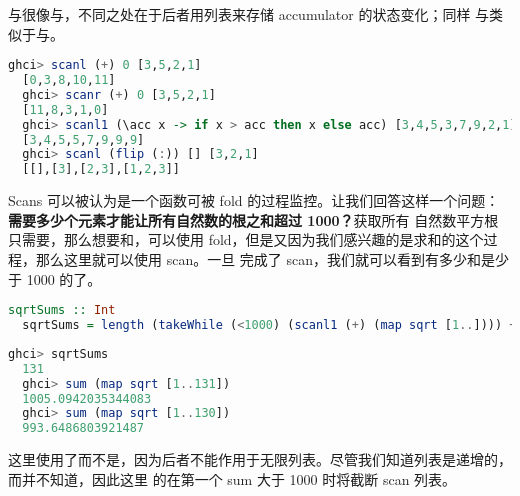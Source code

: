 \documentclass[./main.tex]{subfiles}
\begin{document}
与很像与，不同之处在于后者用列表来存储 accumulator 的状态变化；同样
与类似于与。

\begin{lstlisting}[language=Haskell]
  ghci> scanl (+) 0 [3,5,2,1]
  [0,3,8,10,11]
  ghci> scanr (+) 0 [3,5,2,1]
  [11,8,3,1,0]
  ghci> scanl1 (\acc x -> if x > acc then x else acc) [3,4,5,3,7,9,2,1]
  [3,4,5,5,7,9,9,9]
  ghci> scanl (flip (:)) [] [3,2,1]
  [[],[3],[2,3],[1,2,3]]
\end{lstlisting}

Scans 可以被认为是一个函数可被 fold 的过程监控。让我们回答这样一个问题：\textbf{需要多少个元素才能让所有自然数的根之和超过 1000？}获取所有
自然数平方根只需要，那么想要和，可以使用 fold，但是又因为我们感兴趣的是求和的这个过程，那么这里就可以使用 scan。一旦
完成了 scan，我们就可以看到有多少和是少于 1000 的了。

\begin{lstlisting}[language=Haskell]
  sqrtSums :: Int
  sqrtSums = length (takeWhile (<1000) (scanl1 (+) (map sqrt [1..]))) + 1
\end{lstlisting}

\begin{lstlisting}[language=Haskell]
  ghci> sqrtSums
  131
  ghci> sum (map sqrt [1..131])
  1005.0942035344083
  ghci> sum (map sqrt [1..130])
  993.6486803921487
\end{lstlisting}

这里使用了而不是，因为后者不能作用于无限列表。尽管我们知道列表是递增的，而并不知道，因此这里
的在第一个 sum 大于 1000 时将截断 scan 列表。

\end{document}
